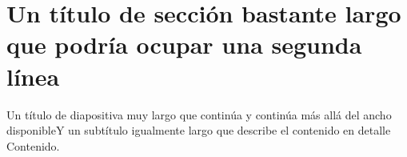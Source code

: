 
\maketitle
\section{Un título de sección bastante largo que podría ocupar una segunda línea}
\begin{frame}{Un título de diapositiva muy largo que continúa y continúa más allá del ancho disponible}{Y un subtítulo igualmente largo que describe el contenido en detalle}
  Contenido.
\end{frame}

